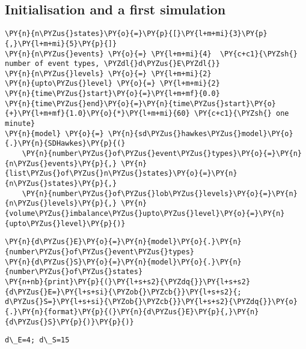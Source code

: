 \documentclass[10pt, article,table]{article}
\begin{document}
\subsection{Initialisation and a first simulation}
   \begin{tcolorbox}[breakable, size=fbox, boxrule=1pt, pad at break*=1mm,colback=cellbackground, colframe=cellborder]
\begin{Verbatim}[commandchars=\\\{\}]
\PY{n}{n\PYZus{}states}\PY{o}{=}\PY{p}{[}\PY{l+m+mi}{3}\PY{p}{,}\PY{l+m+mi}{5}\PY{p}{]} 
\PY{n}{n\PYZus{}events} \PY{o}{=} \PY{l+m+mi}{4}  \PY{c+c1}{\PYZsh{} number of event types, \PYZdl{}d\PYZus{}E\PYZdl{}}
\PY{n}{n\PYZus{}levels} \PY{o}{=} \PY{l+m+mi}{2}
\PY{n}{upto\PYZus{}level} \PY{o}{=} \PY{l+m+mi}{2}
\PY{n}{time\PYZus{}start}\PY{o}{=}\PY{l+m+mf}{0.0}
\PY{n}{time\PYZus{}end}\PY{o}{=}\PY{n}{time\PYZus{}start}\PY{o}{+}\PY{l+m+mf}{1.0}\PY{o}{*}\PY{l+m+mi}{60} \PY{c+c1}{\PYZsh{} one minute}
\PY{n}{model} \PY{o}{=} \PY{n}{sd\PYZus{}hawkes\PYZus{}model}\PY{o}{.}\PY{n}{SDHawkes}\PY{p}{(}
    \PY{n}{number\PYZus{}of\PYZus{}event\PYZus{}types}\PY{o}{=}\PY{n}{n\PYZus{}events}\PY{p}{,} \PY{n}{list\PYZus{}of\PYZus{}n\PYZus{}states}\PY{o}{=}\PY{n}{n\PYZus{}states}\PY{p}{,}
    \PY{n}{number\PYZus{}of\PYZus{}lob\PYZus{}levels}\PY{o}{=}\PY{n}{n\PYZus{}levels}\PY{p}{,} \PY{n}{volume\PYZus{}imbalance\PYZus{}upto\PYZus{}level}\PY{o}{=}\PY{n}{upto\PYZus{}level}\PY{p}{)}
\end{Verbatim}
\end{tcolorbox}
\begin{tcolorbox}[breakable, size=fbox, boxrule=1pt, pad at break*=1mm,colback=cellbackground, colframe=cellborder]
\begin{Verbatim}[commandchars=\\\{\}]
\PY{n}{d\PYZus{}E}\PY{o}{=}\PY{n}{model}\PY{o}{.}\PY{n}{number\PYZus{}of\PYZus{}event\PYZus{}types}
\PY{n}{d\PYZus{}S}\PY{o}{=}\PY{n}{model}\PY{o}{.}\PY{n}{number\PYZus{}of\PYZus{}states}
\PY{n+nb}{print}\PY{p}{(}\PY{l+s+s2}{\PYZdq{}}\PY{l+s+s2}{d\PYZus{}E=}\PY{l+s+si}{\PYZob{}\PYZcb{}}\PY{l+s+s2}{; d\PYZus{}S=}\PY{l+s+si}{\PYZob{}\PYZcb{}}\PY{l+s+s2}{\PYZdq{}}\PY{o}{.}\PY{n}{format}\PY{p}{(}\PY{n}{d\PYZus{}E}\PY{p}{,}\PY{n}{d\PYZus{}S}\PY{p}{)}\PY{p}{)}
\end{Verbatim}
\end{tcolorbox}
\begin{tcolorbox}[breakable, size=fbox, boxrule=.5pt, pad at break*=1mm, opacityfill=0]
\begin{Verbatim}[commandchars=\\\{\}]
d\_E=4; d\_S=15
\end{Verbatim}
\end{tcolorbox}
\end{document}
